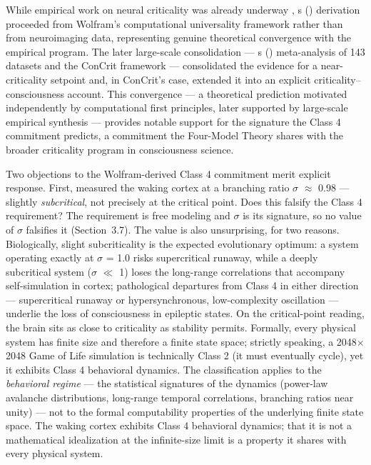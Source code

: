 \documentclass[12pt]{article}
\begin{document}
While empirical work on neural criticality was already underway \citep{Beggs2003,Tagliazucchi2012}, \citeauthor{Gruber2015}\textquotesingle s (\citeyear{Gruber2015}) derivation proceeded from Wolfram's computational universality framework rather than from neuroimaging data, representing genuine theoretical convergence with the empirical program. The later large-scale consolidation --- \citeauthor{HengenShew2025}\textquotesingle s (\citeyear{HengenShew2025}) meta-analysis of 143 datasets and the ConCrit framework \citep{AlgomShriki2026} --- consolidated the evidence for a near-criticality setpoint and, in ConCrit's case, extended it into an explicit criticality--consciousness account. This convergence --- a theoretical prediction motivated independently by computational first principles, later supported by large-scale empirical synthesis --- provides notable support for the signature the Class 4 commitment predicts, a commitment the Four-Model Theory shares with the broader criticality program in consciousness science.

Two objections to the Wolfram-derived Class 4 commitment merit explicit response. First, \citet{Priesemann2013,Priesemann2014} measured the waking cortex at a branching ratio $\sigma$ $\approx$ 0.98 --- slightly \emph{subcritical}, not precisely at the critical point. Does this falsify the Class 4 requirement? The requirement is free modeling and $\sigma$ is its signature, so no value of $\sigma$ falsifies it (Section~3.7). The value is also unsurprising, for two reasons. Biologically, slight subcriticality is the expected evolutionary optimum: a system operating exactly at $\sigma$ = 1.0 risks supercritical runaway, while a deeply subcritical system ($\sigma$ $\ll$ 1) loses the long-range correlations that accompany self-simulation in cortex; pathological departures from Class 4 in either direction --- supercritical runaway or hypersynchronous, low-complexity oscillation --- underlie the loss of consciousness in epileptic states. On the critical-point reading, the brain sits as close to criticality as stability permits. Formally, every physical system has finite size and therefore a finite state space; strictly speaking, a 2048$\times$2048 Game of Life simulation is technically Class 2 (it must eventually cycle), yet it exhibits Class 4 behavioral dynamics. The classification applies to the \emph{behavioral regime} --- the statistical signatures of the dynamics (power-law avalanche distributions, long-range temporal correlations, branching ratios near unity) --- not to the formal computability properties of the underlying finite state space. The waking cortex exhibits Class 4 behavioral dynamics; that it is not a mathematical idealization at the infinite-size limit is a property it shares with every physical system.
\end{document}
